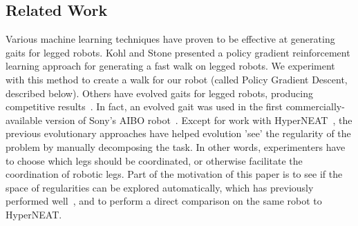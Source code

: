 \subsection{Related Work}



Various machine learning techniques have proven to be effective at generating gaits for legged robots. Kohl and Stone presented a policy gradient reinforcement learning approach for generating a fast walk on legged robots\cite{kohl}. We experiment with this method to create a walk for our robot (called Policy Gradient Descent, described below). Others have evolved gaits for legged robots, producing competitive results~\cite{chernova2005evolutionary, hornby2005autonomous, zykov, clune2009evolving, clune2011performance, clune2009hybrid, clune2009sensitivity, tellez2006evolving, valsalam2008modular}. In fact, an evolved gait was used in the first commercially-available version of Sony's AIBO robot~\cite{hornby2005autonomous}. Except for work with HyperNEAT~\cite{clune2009evolving, clune2011performance, clune2009hybrid, clune2009sensitivity}, the previous evolutionary approaches have helped evolution 'see' the regularity of the problem by manually decomposing the task. In other words, experimenters have to choose which legs should be coordinated, or otherwise facilitate the coordination of robotic legs. Part of the motivation of this paper is to see if the space of regularities can be explored automatically, which has previously performed well~\cite{valsalam2008modular}, and to perform a direct comparison on the same robot to HyperNEAT.  

